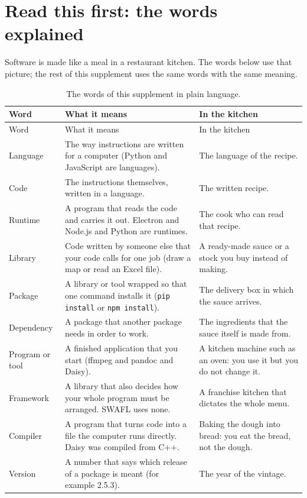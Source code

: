 \section{Read this first: the words explained}
Software is made like a meal in a restaurant kitchen. The words below use that picture; the rest of this supplement uses the same words with the same meaning.
{\small
\begin{longtable}{@{}>{\raggedright\arraybackslash}p{2.9cm}>{\raggedright\arraybackslash}p{4.9cm}>{\raggedright\arraybackslash}p{5.2cm}@{}}
\caption{The words of this supplement in plain language.}\label{tab:words}\\
\toprule Word & What it means & In the kitchen\\\midrule\endfirsthead
\toprule Word & What it means & In the kitchen\\\midrule\endhead
Language & The way instructions are written for a computer (Python and JavaScript are languages). & The language of the recipe.\\
Code & The instructions themselves, written in a language. & The written recipe.\\
Runtime & A program that reads the code and carries it out. Electron and Node.js and Python are runtimes. & The cook who can read that recipe.\\
Library & Code written by someone else that your code calls for one job (draw a map or read an Excel file). & A ready-made sauce or a stock you buy instead of making.\\
Package & A library or tool wrapped so that one command installs it (\texttt{pip install} or \texttt{npm install}). & The delivery box in which the sauce arrives.\\
Dependency & A package that another package needs in order to work. & The ingredients that the sauce itself is made from.\\
Program or tool & A finished application that you start (ffmpeg and pandoc and Daisy). & A kitchen machine such as an oven: you use it but you do not change it.\\
Framework & A library that also decides how your whole program must be arranged. SWAFL uses none. & A franchise kitchen that dictates the whole menu.\\
Compiler & A program that turns code into a file the computer runs directly. Daisy was compiled from C++. & Baking the dough into bread: you eat the bread, not the dough.\\
Version & A number that says which release of a package is meant (for example 2.5.3). & The year of the vintage.\\

\end{longtable}}
